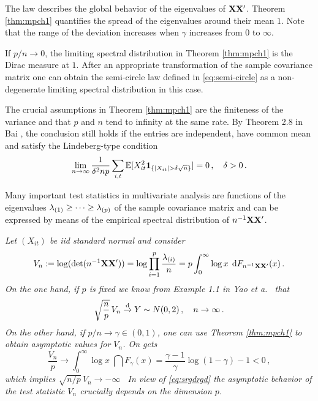 The \MP law describes the global behavior of the eigenvalues of ${\mathbf X} {\mathbf X}'$. Theorem \ref{thm:mpch1} quantifies the spread of the eigenvalues around their mean $1$. Note that the range of the deviation increases when $\gamma$ increases from $0$ to $\infty$.
 
If $p/n\to 0$, the limiting spectral distribution in Theorem \ref{thm:mpch1} is the Dirac measure at $1$. After an appropriate transformation of the sample covariance matrix one can obtain the semi-circle law defined in \eqref{eq:semi-circle} as a non-degenerate limiting spectral distribution in this case. 

The crucial assumptions in Theorem \ref{thm:mpch1} are the finiteness of the variance and that $p$ and $n$ tend to infinity at the same rate. By Theorem 2.8 in Bai \cite{Bai:1999}, the conclusion still holds if the entries are independent, have common mean and satisfy the Lindeberg-type condition
\begin{equation*}
\lim_{\nto} \frac{1}{\delta^2 n p}\sum_{i,t} \E[X_{it}^2 \1_{\{|X_{it}|>\delta \sqrt{n}  \}}] =0\,,\quad \delta>0\,.
\end{equation*}
\par

Many important test statistics in multivariate analysis are functions of the eigenvalues
$\lambda_{(1)}\ge \cdots \ge \lambda_{(p)}$ of the sample covariance matrix and can be expressed by means of the empirical spectral distribution of $n^{-1}{\mathbf X}{\mathbf X}'$.

\begin{example}{\em 
Let $(X_{it})$ be iid standard normal and consider
\begin{equation*}
V_n:=\log(\det (n^{-1}{\mathbf X}{\mathbf X}'))=
\log \prod_{i=1}^p \frac{\lambda_{(i)}}{n} =  p \int_{0}^{\infty} \log x \;\,\mathrm{d} F_{n^{-1}{\mathbf X}{\mathbf X}'}(x)\,.
\end{equation*}
On the one hand, if $p$ is fixed we know from Example 1.1 in Yao et a.~\cite{yao:zheng:bai:2015} that 
\begin{equation}\label{eq:srgdrgd}
\sqrt{\frac{n}{p}}\, V_n \stackrel{\rm d}{\rightarrow} Y\sim N(0,2)\,,\quad n \to \infty\,.
\end{equation}
On the other hand, if $p/n \to \gamma\in (0,1)$, one can use Theorem \ref{thm:mpch1} to obtain asymptotic values for $V_n$. On gets \as
\begin{equation*}
\frac{V_n}{p}\to \int_{0}^{\infty} \log x \;\dint F_{\gamma}(x)= \frac{\gamma-1}{\gamma} \log(1-\gamma)-1<0\,,
\end{equation*}
which implies $\sqrt{n/p}\, V_n \to -\infty$ \as~In view of \eqref{eq:srgdrgd} the asymptotic behavior of the test statistic $V_n$ crucially depends on the dimension $p$.}
\end{example}
 
